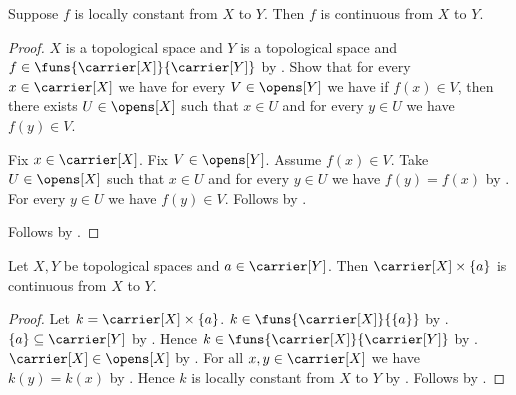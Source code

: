 \begin{theorem}\label{locally_constant_map_is_continuous}
    Suppose $f$ is locally constant from $X$ to $Y$.
    Then $f$ is continuous from $X$ to $Y$.
\end{theorem}
\begin{proof}
    $X$ is a topological space and $Y$ is a topological space and
        $f\in\funs{\carrier[X]}{\carrier[Y]}$
        by .
    Show that for every $x\in\carrier[X]$ we have
        for every $V\in\opens[Y]$ we have if $f(x)\in V$, then
            there exists $U\in\opens[X]$ such that $x\in U$ and
                for every $y\in U$ we have $f(y)\in V$.
    \begin{subproof}
        Fix $x\in\carrier[X]$.
        Fix $V\in\opens[Y]$.
        Assume $f(x)\in V$.
        Take $U\in\opens[X]$ such that $x\in U$ and
            for every $y\in U$ we have $f(y)=f(x)$
            by .
        For every $y\in U$ we have $f(y)\in V$.
        Follows by \auto.
    \end{subproof}
    Follows by .
\end{proof}

\begin{theorem}\label{constant_graph_continuous}
    Let $X,Y$ be topological spaces and $a\in\carrier[Y]$.
    Then $\carrier[X]\times\{a\}$ is continuous from $X$ to $Y$.
\end{theorem}
\begin{proof}
    Let $k=\carrier[X]\times\{a\}$.
    $k\in\funs{\carrier[X]}{\{a\}}$ by .
    $\{a\}\subseteq\carrier[Y]$ by .
    Hence $k\in\funs{\carrier[X]}{\carrier[Y]}$ by .
    $\carrier[X]\in\opens[X]$ by .
    For all $x,y\in\carrier[X]$ we have $k(y)=k(x)$ by
        .
    Hence $k$ is locally constant from $X$ to $Y$ by .
    Follows by .
\end{proof}
